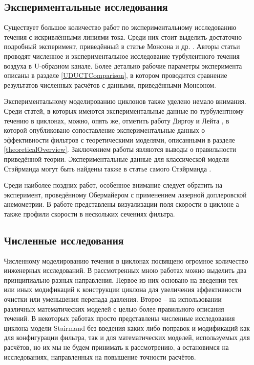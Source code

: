   
	\subsection{Экспериментальные исследования}
		Существует большое количество работ по экспериментальному исследованию течения с искривлёнными линиями тока. Среди них стоит выделить достаточно подробный эксперимент, приведённый в статье Монсона и др. \cite{Monson}. Авторы статьи проводят численное и экспериментальное исследование турбулентного течения воздуха в U-образном канале. Более детально рабочие параметры эксперимента описаны в разделе \ref{UDUCTComparison}, в котором проводится сравнение результатов численных расчётов с данными, приведёнными Монсоном.
		
		Экспериментальному моделированию циклонов также уделено немало внимания. Среди статей, в которых имеются экспериментальные данные по турбулентному течению в циклонах, можно, опять же, отметить работу Диргоу и Лейта \cite{DirgoLeith}, в которой опубликовано сопоставление  экспериментальные данных о эффективности фильтров с теоретическими моделями, описанными в разделе \ref{theoreticalOverview}. Заключением работы являются выводы о правильности приведённой теории. Экспериментальные данные для классической модели Стэйрманда могут быть найдены также в статье самого Стэйрманда \cite{Stairmand}. 
		
		Среди наиболее поздних работ, особенное внимание следует обратить на эксперимент, проведённому Обермайером \cite{Obermaier} с применением лазерной доплеровской анемометрии. В работе представлены визуализации поля скорости в циклоне а также профили скорости в нескольких сечениях фильтра.
	\subsection{Численные исследования}
Численному моделированию течения в циклонах посвящено огромное количество инженерных исследований. В рассмотренных мною работах можно выделить два принципиально разных направления. Первое из них основано на введении тех или иных модификаций к конструкции циклона для увеличения эффективности очистки или уменьшения перепада давления. Второе -- на использовании различных математических моделей с целью более правильного описания течений. В некоторых работах просто представлены численные исследования циклона модели Stairmand без введения каких-либо поправок и модификаций как для конфигурации фильтра, так и для математических моделей, используемых для расчётов, но их мы не будем принимать к рассмотрению, а остановимся на исследованиях, направленных на повышение точности расчётов.
		
